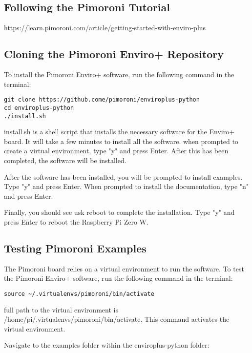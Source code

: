 \documentclass{article}
\begin{document}
\subsection{Following the Pimoroni Tutorial}

\url{https://learn.pimoroni.com/article/getting-started-with-enviro-plus}

\subsection{Cloning the Pimoroni Enviro+ Repository}

To install the Pimoroni Enviro+ software, run the following command in the terminal:

\begin{verbatim}
git clone https://github.come/pimoroni/enviroplus-python
cd enviroplus-python
./install.sh
\end{verbatim}

install.sh is a shell script that installs the necessary software for the Enviro+ board. It will take a few minutes to install all the software. when prompted to create a virtual environment, type "y" and press Enter. After this has been completed, the software will be installed. 

After the software has been installed, you will be prompted to install examples. Type "y" and press Enter.
When prompted to install the documentation, type "n" and press Enter. 

Finally, you should see usk reboot to complete the installation. Type "y" and press Enter to reboot the Raspberry Pi Zero W.

\subsection{Testing Pimoroni Examples}

The Pimoroni board relies on a virtual environment to run the software. To test the Pimoroni Enviro+ software, run the following command in the terminal:

\begin{verbatim}
source ~/.virtualenvs/pimoroni/bin/activate
\end{verbatim}

full path to the virtual environment is /home/pi/.virtualenvs/pimoroni/bin/activate. This command activates the virtual environment.

Navigate to the examples folder within the enviroplus-python folder:
\end{document}
